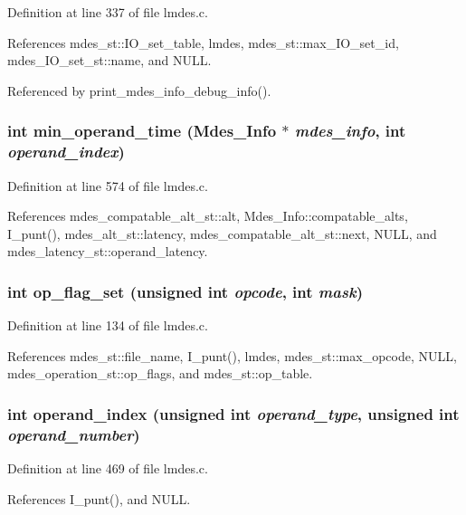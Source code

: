 Definition at line 337 of file lmdes.c.

References mdes\_\-st::IO\_\-set\_\-table, lmdes, mdes\_\-st::max\_\-IO\_\-set\_\-id, mdes\_\-IO\_\-set\_\-st::name, and NULL.

Referenced by print\_\-mdes\_\-info\_\-debug\_\-info().
\subsubsection{\setlength{\rightskip}{0pt plus 5cm}int min\_\-operand\_\-time (\bf{Mdes\_\-Info} $\ast$ {\em mdes\_\-info}, int {\em operand\_\-index})}\label{lmdes_8c_4b89be1b05bc574c5cc042cdeb8bb750}




Definition at line 574 of file lmdes.c.

References mdes\_\-compatable\_\-alt\_\-st::alt, Mdes\_\-Info::compatable\_\-alts, I\_\-punt(), mdes\_\-alt\_\-st::latency, mdes\_\-compatable\_\-alt\_\-st::next, NULL, and mdes\_\-latency\_\-st::operand\_\-latency.
\subsubsection{\setlength{\rightskip}{0pt plus 5cm}int op\_\-flag\_\-set (unsigned int {\em opcode}, int {\em mask})}\label{lmdes_8c_67805a2222096472207405f876bd1303}




Definition at line 134 of file lmdes.c.

References mdes\_\-st::file\_\-name, I\_\-punt(), lmdes, mdes\_\-st::max\_\-opcode, NULL, mdes\_\-operation\_\-st::op\_\-flags, and mdes\_\-st::op\_\-table.
\subsubsection{\setlength{\rightskip}{0pt plus 5cm}int operand\_\-index (unsigned int {\em operand\_\-type}, unsigned int {\em operand\_\-number})}\label{lmdes_8c_e84d5f3f40b5dc3a74d29e1f3762c671}




Definition at line 469 of file lmdes.c.

References I\_\-punt(), and NULL.


